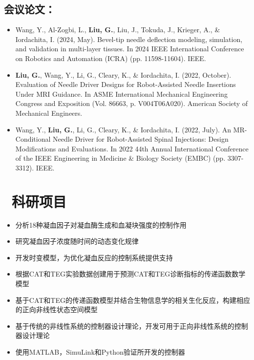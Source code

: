 \documentclass{resume}
\begin{document}
\subsection{会议论文：}
\begin{itemize}
  \item Wang, Y., Al-Zogbi, L., \textbf{Liu, G.}, Liu, J., Tokuda, J., Krieger, A., \& Iordachita, I. (2024, May). Bevel-tip needle deflection modeling, simulation, and validation in multi-layer tissues. In 2024 IEEE International Conference on Robotics and Automation (ICRA) (pp. 11598-11604). IEEE.
  \item \textbf{Liu, G.}, Wang, Y., Li, G., Cleary, K., \& Iordachita, I. (2022, October). Evaluation of Needle Driver Designs for Robot-Assisted Needle Insertions Under MRI Guidance. In ASME International Mechanical Engineering Congress and Exposition (Vol. 86663, p. V004T06A020). American Society of Mechanical Engineers.
  \item Wang, Y., \textbf{Liu, G.}, Li, G., Cleary, K., \& Iordachita, I. (2022, July). An MR-Conditional Needle Driver for Robot-Assisted Spinal Injections: Design Modifications and Evaluations. In 2022 44th Annual International Conference of the IEEE Engineering in Medicine \& Biology Society (EMBC) (pp. 3307-3312). IEEE.
\end{itemize}

\section{\faList\ 科研项目}
\vspace{-0.7em}
\begin{onehalfspacing}
\begin{itemize}
  \item 分析18种凝血因子对凝血酶生成和血凝块强度的控制作用
  \item 研究凝血因子浓度随时间的动态变化规律
  \item 开发时变模型，为优化凝血反应的控制系统提供支持
\end{itemize}
\end{onehalfspacing}

\vspace{-0.7em}
\begin{onehalfspacing}
  \begin{itemize}
    \item 根据CAT和TEG实验数据创建用于预测CAT和TEG诊断指标的传递函数数学模型
    \item 基于CAT和TEG的传递函数模型并结合生物信息学的相关生化反应，构建相应的正向非线性状态空间模型
    \item 基于传统的非线性系统的控制器设计理论，开发可用于正向非线性系统的控制器设计理论
    \item 使用MATLAB，SimuLink和Python验证所开发的控制器
  \end{itemize}
\end{onehalfspacing}
\end{document}
